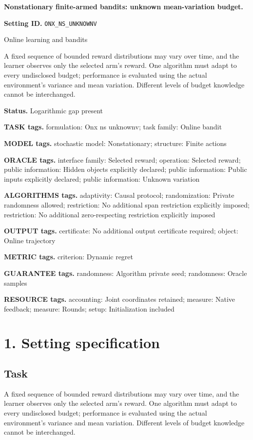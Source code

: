 \documentclass[10pt,a4paper]{article}
\begin{document}
\raggedright

{\LARGE\bfseries\sffamily\color{AtlasNavy} Nonstationary finite-armed bandits: unknown mean-variation budget.\par}\vspace{5pt}
\textbf{Setting ID.} \texttt{ONX\_\allowbreak{}NS\_\allowbreak{}UNKNOWNV}

Online learning and bandits

A fixed sequence of bounded reward distributions may vary over time, and the learner observes only the selected arm's reward. One algorithm must adapt to every undisclosed budget; performance is evaluated using the actual environment's variance and mean variation. Different levels of budget knowledge cannot be interchanged.

\textbf{Status.} Logarithmic gap present

\textbf{TASK tags.} formulation: Onx ns unknownv; task family: Online bandit

\textbf{MODEL tags.} stochastic model: Nonstationary; structure: Finite actions

\textbf{ORACLE tags.} interface family: Selected reward; operation: Selected reward; public information: Hidden objects explicitly declared; public information: Public inputs explicitly declared; public information: Unknown variation

\textbf{ALGORITHMS tags.} adaptivity: Causal protocol; randomization: Private randomness allowed; restriction: No additional span restriction explicitly imposed; restriction: No additional zero-respecting restriction explicitly imposed

\textbf{OUTPUT tags.} certificate: No additional output certificate required; object: Online trajectory

\textbf{METRIC tags.} criterion: Dynamic regret

\textbf{GUARANTEE tags.} randomness: Algorithm private seed; randomness: Oracle samples

\textbf{RESOURCE tags.} accounting: Joint coordinates retained; measure: Native feedback; measure: Rounds; setup: Initialization included

\section{1. Setting specification}
\subsection{Task}
A fixed sequence of bounded reward distributions may vary over time, and the learner observes only the selected arm's reward. One algorithm must adapt to every undisclosed budget; performance is evaluated using the actual environment's variance and mean variation. Different levels of budget knowledge cannot be interchanged.
\end{document}
